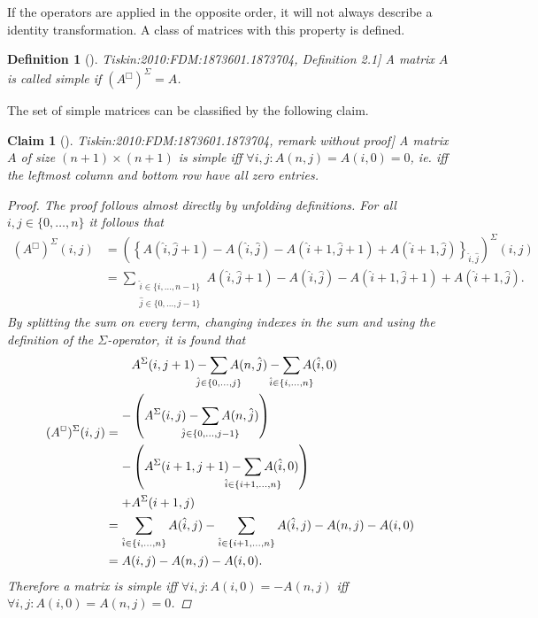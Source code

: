\documentclass[twoside,11pt,openright]{report}
\newcommand{\reftiskin}[2]{\cite[#1]{Tiskin:2010:FDM:1873601.1873704}, #2}
\newtheorem{mydef}{Definition}
\newtheorem{claim}{Claim}
\begin{document}
If the operators are applied in the opposite order, it will not always describe a identity transformation. A class of matrices with this property is defined.
\begin{mydef}[\reftiskin{p. 1288}{Definition 2.1}]
  \label{def:simple}
  A matrix $A$ is called simple if $(A^{\Box})^\Sigma = A$.
\end{mydef}
The set of simple matrices can be classified by the following claim.
\begin{claim}[\reftiskin{p. 1288}{remark without proof}]
  \label{claim:simple-matrix-characterization}
  A matrix $A$ of size $(n + 1) \times (n + 1)$ is simple iff $\forall i,j: A(n, j) = A(i, 0) = 0$, ie. iff the leftmost column and bottom row have all zero entries.
  \begin{proof}
    The proof follows almost directly by unfolding definitions. For all $i, j \in \{ 0, \dots, n \}$ it follows that%
    \begin{align*}
      (A^{\Box})^{\Sigma}(i, j) &= \left( \left\{ A(\hat{i}, \hat{j} + 1) - A(\hat{i}, \hat{j}) - A(\hat{i} + 1, \hat{j} + 1) + A(\hat{i} + 1, \hat{j}) \right\}_{\hat{i}, \hat{j}} \right)^{\Sigma}(i, j) \\
        &= \sum_{\substack{\hat{i} \in \{i, \dots, n - 1\} \\ \hat{j} \in \{0, \dots, j - 1\}}} { A(\hat{i}, \hat{j} + 1) - A(\hat{i}, \hat{j}) - A(\hat{i} + 1, \hat{j} + 1) + A(\hat{i} + 1, \hat{j}) } .
    \end{align*}%
    By splitting the sum on every term, changing indexes in the sum and using the definition of the $\Sigma$-operator, it is found that
    \begin{align*}
      (A^{\Box})^{\Sigma}(i, j) &=
        \begin{aligned}
          &A^{\Sigma}(i, j + 1) - \sum_{\mathclap{\hat{j} \in \{0, \dots, j\}}} A(n, \hat{j}) - \sum_{\mathclap{\hat{i} \in \{i, \dots, n\}}} {A(\hat{i}, 0)} \\
          - &\left( A^{\Sigma}(i, j) - \sum_{\mathclap{\hat{j} \in \{0, \dots, j - 1\}}} A(n, \hat{j}) \right) \\
          - &\left( A^{\Sigma}(i + 1, j + 1) - \sum_{\mathclap{\hat{i} \in \{i + 1, \dots, n\}}} A(\hat{i}, 0) \right) \\
          + &A^{\Sigma}(i + 1, j)
        \end{aligned} \\
        &= \sum_{\hat{i} \in \{i, \dots, n\}} A(\hat{i}, j) - \sum_{\hat{i} \in \{i + 1, \dots, n\}} A(\hat{i}, j) - A(n, j) - A(i, 0) \\
        &= A(i, j) - A(n, j) - A(i, 0).
    \end{align*}
    Therefore a matrix is simple iff $\forall i, j: A(i, 0) = -A(n, j)$ iff $\forall i, j: A(i, 0) = A(n, j) = 0$.
  \end{proof}
\end{claim}
\end{document}
